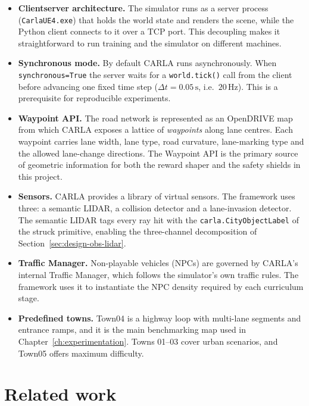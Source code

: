\begin{itemize}
  \item \textbf{Client\textendash server architecture.} The simulator runs as a server process
        (\texttt{CarlaUE4.exe}) that holds the world state and renders the scene, while the
        Python client connects to it over a TCP port. This decoupling makes it straightforward
        to run training and the simulator on different machines.
  \item \textbf{Synchronous mode.} By default CARLA runs asynchronously. When
        \texttt{synchronous=True} the server waits for a \texttt{world.tick()} call from the
        client before advancing one fixed time step (\(\Delta t = 0.05\,\mathrm{s}\), i.e.\
        \(20\,\mathrm{Hz}\)). This is a prerequisite for reproducible experiments.
  \item \textbf{Waypoint API.} The road network is represented as an OpenDRIVE map from which
        CARLA exposes a lattice of \emph{waypoints} along lane centres. Each waypoint carries
        lane width, lane type, road curvature, lane-marking type and the allowed lane-change
        directions. The Waypoint API is the primary source of geometric information for both the
        reward shaper and the safety shields in this project.
  \item \textbf{Sensors.} CARLA provides a library of virtual sensors. The framework uses three:
        a semantic LIDAR, a collision detector and a lane-invasion detector. The semantic LIDAR
        tags every ray hit with the \texttt{carla.CityObjectLabel} of the struck primitive,
        enabling the three-channel decomposition of Section~\ref{sec:design-obs-lidar}.
  \item \textbf{Traffic Manager.} Non-playable vehicles (NPCs) are governed by CARLA's internal
        Traffic Manager, which follows the simulator's own traffic rules. The framework uses it
        to instantiate the NPC density required by each curriculum stage.
  \item \textbf{Predefined towns.} Town04 is a highway loop with multi-lane segments and
        entrance ramps, and it is the main benchmarking map used in
        Chapter~\ref{ch:experimentation}. Towns 01--03 cover urban scenarios, and Town05 offers
        maximum difficulty.
\end{itemize}

\section{Related work}\label{sec:sota-related}

